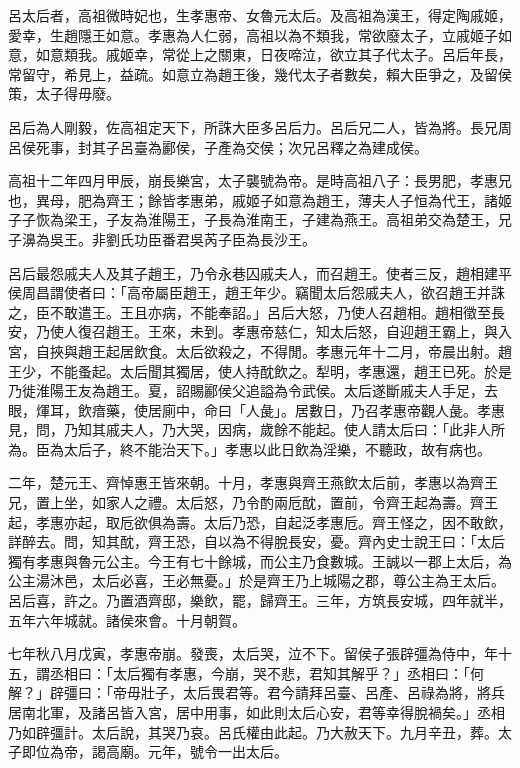 
\begin{pinyinscope}
呂太后者，高祖微時妃也，生孝惠帝、女魯元太后。及高祖為漢王，得定陶戚姬，愛幸，生趙隱王如意。孝惠為人仁弱，高祖以為不類我，常欲廢太子，立戚姬子如意，如意類我。戚姬幸，常從上之關東，日夜啼泣，欲立其子代太子。呂后年長，常留守，希見上，益疏。如意立為趙王後，幾代太子者數矣，賴大臣爭之，及留侯策，太子得毋廢。

呂后為人剛毅，佐高祖定天下，所誅大臣多呂后力。呂后兄二人，皆為將。長兄周呂侯死事，封其子呂臺為酈侯，子產為交侯；次兄呂釋之為建成侯。

高祖十二年四月甲辰，崩長樂宮，太子襲號為帝。是時高祖八子：長男肥，孝惠兄也，異母，肥為齊王；餘皆孝惠弟，戚姬子如意為趙王，薄夫人子恒為代王，諸姬子子恢為梁王，子友為淮陽王，子長為淮南王，子建為燕王。高祖弟交為楚王，兄子濞為吳王。非劉氏功臣番君吳芮子臣為長沙王。

呂后最怨戚夫人及其子趙王，乃令永巷囚戚夫人，而召趙王。使者三反，趙相建平侯周昌謂使者曰：「高帝屬臣趙王，趙王年少。竊聞太后怨戚夫人，欲召趙王并誅之，臣不敢遣王。王且亦病，不能奉詔。」呂后大怒，乃使人召趙相。趙相徵至長安，乃使人復召趙王。王來，未到。孝惠帝慈仁，知太后怒，自迎趙王霸上，與入宮，自挾與趙王起居飲食。太后欲殺之，不得閒。孝惠元年十二月，帝晨出射。趙王少，不能蚤起。太后聞其獨居，使人持酖飲之。犁明，孝惠還，趙王已死。於是乃徙淮陽王友為趙王。夏，詔賜酈侯父追謚為令武侯。太后遂斷戚夫人手足，去眼，煇耳，飲瘖藥，使居廁中，命曰「人彘」。居數日，乃召孝惠帝觀人彘。孝惠見，問，乃知其戚夫人，乃大哭，因病，歲餘不能起。使人請太后曰：「此非人所為。臣為太后子，終不能治天下。」孝惠以此日飲為淫樂，不聽政，故有病也。

二年，楚元王、齊悼惠王皆來朝。十月，孝惠與齊王燕飲太后前，孝惠以為齊王兄，置上坐，如家人之禮。太后怒，乃令酌兩卮酖，置前，令齊王起為壽。齊王起，孝惠亦起，取卮欲俱為壽。太后乃恐，自起泛孝惠卮。齊王怪之，因不敢飲，詳醉去。問，知其酖，齊王恐，自以為不得脫長安，憂。齊內史士說王曰：「太后獨有孝惠與魯元公主。今王有七十餘城，而公主乃食數城。王誠以一郡上太后，為公主湯沐邑，太后必喜，王必無憂。」於是齊王乃上城陽之郡，尊公主為王太后。呂后喜，許之。乃置酒齊邸，樂飲，罷，歸齊王。三年，方筑長安城，四年就半，五年六年城就。諸侯來會。十月朝賀。

七年秋八月戊寅，孝惠帝崩。發喪，太后哭，泣不下。留侯子張辟彊為侍中，年十五，謂丞相曰：「太后獨有孝惠，今崩，哭不悲，君知其解乎？」丞相曰：「何解？」辟彊曰：「帝毋壯子，太后畏君等。君今請拜呂臺、呂產、呂祿為將，將兵居南北軍，及諸呂皆入宮，居中用事，如此則太后心安，君等幸得脫禍矣。」丞相乃如辟彊計。太后說，其哭乃哀。呂氏權由此起。乃大赦天下。九月辛丑，葬。太子即位為帝，謁高廟。元年，號令一出太后。


\end{pinyinscope}

